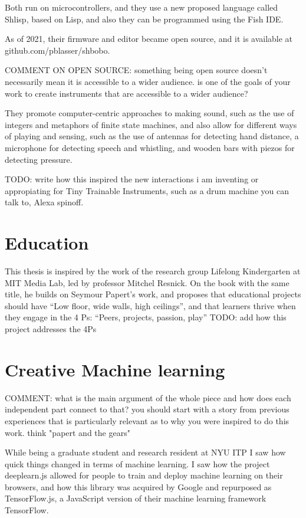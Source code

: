Both run on microcontrollers, and they use a new proposed language called Shlisp, based on Lisp, and also they can be programmed using the Fish IDE.

As of 2021, their firmware and editor became open source, and it is available at github.com/pblasser/shbobo.

COMMENT ON OPEN SOURCE: something being open source doesn't necessarily mean it is accessible to a wider audience. is one of the goals of your work to create instruments that are accessible to a wider audience?

They promote computer-centric approaches to making sound, such as the use of integers and metaphors of finite state machines, and also allow for different ways of playing and sensing, such as the use of antennas for detecting hand distance, a microphone for detecting speech and whistling, and wooden bars with piezos for detecting pressure.

TODO: write how this inspired the new interactions i am inventing or appropiating for Tiny Trainable Instruments, such as a drum machine you can talk to, Alexa spinoff.

\section{Education}

This thesis is inspired by the work of the research group Lifelong Kindergarten at MIT Media Lab, led by professor Mitchel Resnick. On the book with the same title, he builds on Seymour Papert’s work, and proposes that educational projects should have “Low floor, wide walls, high ceilings”, and that learners thrive when they engage in the 4 Ps: “Peers, projects, passion, play”
TODO: add how this project addresses the 4Ps

\section{Creative Machine learning}

COMMENT: what is the main argument of the whole piece and how does each independent part connect to that? you should start with a story from previous experiences that is particularly relevant as to why you were inspired to do this work. think "papert and the gears"

While being a graduate student and research resident at NYU ITP I saw how quick things changed in terms of machine learning. I saw how the project deeplearn.js allowed for people to train and deploy machine learning on their browsers, and how this library was acquired by Google and repurposed as TensorFlow.js, a JavaScript version of their machine learning framework TensorFlow.

